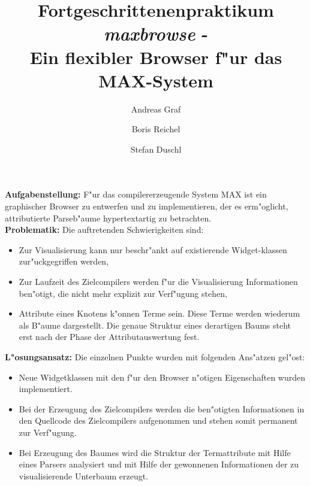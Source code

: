 

\germanTeX

\pagestyle{plain}



\title{
Fortgeschrittenenpraktikum\\
\vspace*{1em}
{\em maxbrowse} -\\
Ein flexibler Browser f"ur das MAX-System}

\author{
  Andreas Graf
\and
  Boris Reichel
\and
  Stefan Duschl}

\maketitle

{\bf Aufgabenstellung:} F"ur das compilererzeugende System MAX ist
ein graphischer Browser zu entwerfen und zu implementieren, der
es erm"oglicht, attributierte Parseb"aume hypertextartig zu betrachten.\\[0.5cm]


{\bf Problematik:} Die auftretenden Schwierigkeiten sind:
\begin{itemize}
	\item Zur Visualisierung kann nur beschr"ankt auf existierende
		Widget-klassen zur"uckgegriffen werden,
	\item Zur Laufzeit des Zielcompilers werden f"ur die Visualisierung
	     Informationen ben"otigt, die nicht mehr explizit zur Verf"ugung
		stehen,
	\item Attribute eines Knotens k"onnen Terme sein. Diese Terme werden
		wiederum als B"aume dargestellt. Die genaue Struktur eines
		derartigen Baums steht erst nach der Phase der Attributauswertung
		fest.
\end{itemize}\par

{\bf L"osungsansatz:} Die einzelnen Punkte wurden mit folgenden Ans"atzen gel"ost:
\begin{itemize}
	\item Neue Widgetklassen mit den f"ur den Browser n"otigen Eigenschaften
		wurden implementiert.
	\item Bei der Erzeugung des Zielcompilers werden die ben"otigten Informationen
		in den Quellcode des Zielcompilers aufgenommen und stehen somit
		permanent zur Verf"ugung.
	\item Bei Erzeugung des Baumes wird die Struktur der Termattribute mit Hilfe
		eines Parsers analysiert und mit Hilfe der gewonnenen Informationen
		der zu visualisierende Unterbaum erzeugt.
\end{itemize}\par





